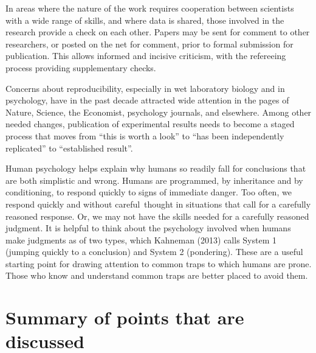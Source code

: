 \documentclass[
  10pt,
  b5paper]{book}
\begin{document}
In areas where the nature of the work requires cooperation between
scientists with a wide range of skills, and where data is shared,
those involved in the research provide a check on each other.
Papers may be sent for comment to other researchers, or posted on
the net for comment, prior to formal submission for publication.
This allows informed and incisive criticism, with the refereeing
process providing supplementary checks.

Concerns about reproducibility, especially in wet laboratory
biology and in psychology, have in the past decade attracted
wide attention in the pages of Nature, Science, the Economist,
psychology journals, and elsewhere. Among other needed changes,
publication of experimental results needs to become a staged
process that moves from ``this is worth a look'' to ``has been
independently replicated'' to ``established result''.

Human psychology helps explain why humans so readily fall for
conclusions that are both simplistic and wrong. Humans are
programmed, by inheritance and by conditioning, to respond
quickly to signs of immediate danger. Too often, we respond
quickly and without careful~thought in situations that call
for a carefully reasoned response. Or, we may not have the
skills needed for a carefully reasoned judgment.
It is helpful to think about the psychology involved when humans
make judgments as of two types, which Kahneman (2013) calls System 1
(jumping quickly to a conclusion) and System 2 (pondering).
These are a useful starting point for drawing attention to common
traps to which humans are prone. Those who know and understand
common traps are better placed to avoid them.

\hypertarget{summary-of-points-that-are-discussed}{%
\chapter*{Summary of points that are discussed}\label{summary-of-points-that-are-discussed}}
\end{document}
